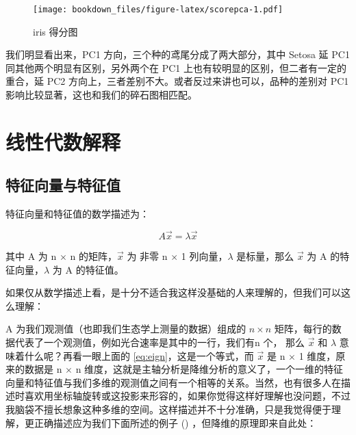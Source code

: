 \documentclass[
]{krantz}
\makeatletter
\newenvironment{Shaded}{\begin{snugshade}}{\end{snugshade}}
\newcommand{\AttributeTok}[1]{\textcolor[rgb]{0.77,0.63,0.00}{#1}}
\newcommand{\ConstantTok}[1]{\textcolor[rgb]{0.00,0.00,0.00}{#1}}
\newcommand{\FunctionTok}[1]{\textcolor[rgb]{0.00,0.00,0.00}{#1}}
\newcommand{\NormalTok}[1]{#1}
\newcommand{\SpecialCharTok}[1]{\textcolor[rgb]{0.00,0.00,0.00}{#1}}
\newenvironment{kframe}{%
\medskip{}
\setlength{\fboxsep}{.8em}
 \def\at@end@of@kframe{}%
 \ifinner\ifhmode%
  \def\at@end@of@kframe{\end{minipage}}%
  \begin{minipage}{\columnwidth}%
 \fi\fi%
 \def\FrameCommand##1{\hskip\@totalleftmargin \hskip-\fboxsep
 \colorbox{shadecolor}{##1}\hskip-\fboxsep
     \hskip-\linewidth \hskip-\@totalleftmargin \hskip\columnwidth}%
 \MakeFramed {\advance\hsize-\width
   \@totalleftmargin\z@ \linewidth\hsize
   \@setminipage}}%
 {\par\unskip\endMakeFramed%
 \at@end@of@kframe}
\renewenvironment{Shaded}{\begin{kframe}}{\end{kframe}}
\makeatother
\begin{document}
\begin{Shaded}
\end{Shaded}

\begin{figure}
\centering
\texttt{[image: bookdown\_files/figure-latex/scorepca-1.pdf]}
\caption{\label{fig:scorepca}iris 得分图}
\end{figure}

我们明显看出来，PC1 方向，三个种的鸢尾分成了两大部分，其中 Setosa 延 PC1 同其他两个明显有区别，另外两个在 PC1 上也有较明显的区别，但二者有一定的重合，延 PC2 方向上，三者差别不大。或者反过来讲也可以，品种的差别对 PC1 影响比较显著，这也和我们的碎石图相匹配。

\hypertarget{alge-pca}{%
\section{线性代数解释}\label{alge-pca}}

\hypertarget{egi-pca}{%
\subsection{特征向量与特征值}\label{egi-pca}}

特征向量和特征值的数学描述为：

\begin{equation}
A \vec{x} = \lambda \vec{x}
\label{eq:eign}
\end{equation}

其中 A 为 n \(\times\) n 的矩阵，\(\vec{x}\) 为 非零 n \(\times\) 1 列向量，\(\lambda\) 是标量，那么 \(\vec{x}\) 为 A 的特征向量，\(\lambda\) 为 A 的特征值。

如果仅从数学描述上看，是十分不适合我这样没基础的人来理解的，但我们可以这么理解：

A 为我们观测值（也即我们生态学上测量的数据）组成的 \(n \times n\) 矩阵，每行的数据代表了一个观测值，例如光合速率是其中的一行，我们有n 个， 那么 \(\vec{x}\) 和 \(\lambda\) 意味着什么呢？再看一眼上面的 \eqref{eq:eign}，这是一个等式，而 \(\vec{x}\) 是 n \(\times\) 1 维度，原来的数据是 n \(\times\) n 维度，这就是主轴分析是降维分析的意义了，一个一维的特征向量和特征值与我们多维的观测值之间有一个相等的关系。当然，也有很多人在描述时喜欢用坐标轴旋转或这投影来形容的，如果你觉得这样好理解也没问题，不过我脑袋不擅长想象这种多维的空间。这样描述并不十分准确，只是我觉得便于理解，更正确描述应为我们下面所述的例子 (\citet{Smith2002}) ，但降维的原理即来自此处：
\end{document}
